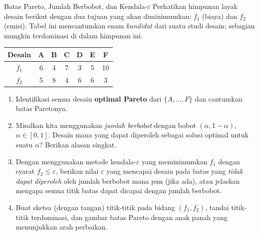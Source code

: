 
\begin{ex}{Batas Pareto, Jumlah Berbobot, dan Kendala-$\varepsilon$}{}
\label{ex:pareto-table}
Perhatikan himpunan layak desain berikut dengan dua tujuan yang akan diminimumkan: $f_1$ (biaya) dan $f_2$ (emisi).
Tabel ini mencantumkan enam \emph{kandidat} dari suatu studi desain; sebagian mungkin terdominasi di dalam himpunan ini.

\begin{center}
\begin{tabular}{c|cccccc}
Desain & A & B & C & D & E & F \\\hline
$f_1$  & 6 & 4 & 7 & 3 & 5 & 10 \\
$f_2$  & 5 & 8 & 4 & 6 & 6 & 3 \\
\end{tabular}
\par{}\label{tab:multi-objective-optimization_updated-tab02}%

\end{center}

\begin{enumerate}
\item Identifikasi semua desain \textbf{optimal Pareto} dari $\{A,\ldots,F\}$ dan cantumkan batas Paretonya.
\vspace{2cm}

\item Misalkan kita menggunakan \emph{jumlah berbobot} dengan bobot $(\alpha,1-\alpha)$, $\alpha\in[0,1]$. Desain mana yang dapat diperoleh sebagai solusi optimal untuk suatu $\alpha$? Berikan alasan singkat.

\vspace{2cm}

\item Dengan menggunakan metode kendala-$\varepsilon$ yang meminimumkan $f_1$ dengan syarat $f_2\le \varepsilon$, berikan nilai $\varepsilon$ yang mencapai desain pada batas yang \emph{tidak dapat diperoleh} oleh jumlah berbobot mana pun (jika ada), atau jelaskan mengapa semua titik batas dapat dicapai dengan jumlah berbobot.

\vspace{2cm}

\item Buat sketsa (dengan tangan) titik-titik pada bidang $(f_1,f_2)$, tandai titik-titik terdominasi, dan gambar batas Pareto dengan anak panah yang menunjukkan arah perbaikan.

\vspace{6cm}
\end{enumerate}
\end{ex}

